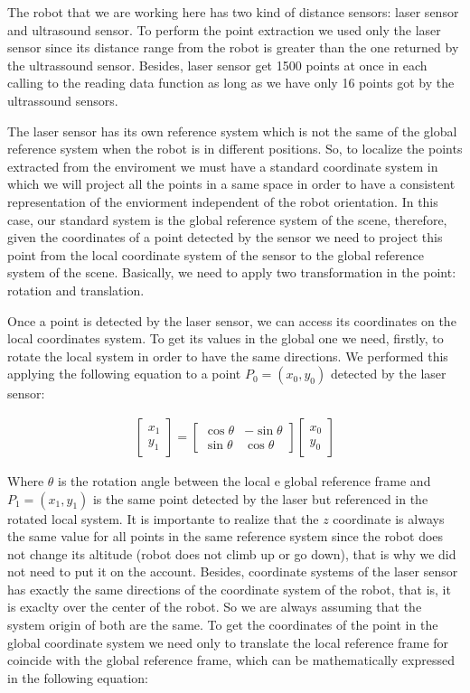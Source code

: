 \documentclass[twoside,conference,a4paper]{IEEEtran}
\begin{document}
The robot that we are working here has two kind of distance sensors: laser sensor and ultrasound sensor. To perform
the point extraction we used only the laser sensor since its distance range from the robot is greater than the one 
returned by the ultrassound sensor. Besides, laser sensor get 1500 points at once in each calling to the reading data 
function as long as we have only 16 points got by the ultrassound sensors. \par 
The laser sensor has its own reference system which is not the same of the global reference system when the robot is 
in different positions. So, to localize the points extracted from the enviroment we must have a standard
coordinate system in which we will project all the points in a same space in order to have a consistent representation
of the enviorment independent of the robot orientation. In this case, our standard system is the global reference system
of the scene, therefore, given the coordinates of a point detected by the sensor we need to project this point from the
local coordinate system of the sensor to the global reference system of the scene. Basically, we need to apply two 
transformation in the point: rotation and translation. \par
Once a point is detected by the laser sensor, we can access its coordinates on the local coordinates system. To get its 
values in the global one we need, firstly, to rotate the local system in order to have the same directions. 
We performed this applying the following equation to a point $ P_{0} = (x_{0}, y_{0}) $ detected by the 
laser sensor:

\begin{gather}
 \begin{bmatrix} x_{1} \\ y_{1} \end{bmatrix}
 =
  \begin{bmatrix}
   \cos \theta & -\sin \theta \\
   \sin \theta & \cos \theta 
   \end{bmatrix}
   \begin{bmatrix} x_{0} \\ y_{0} \end{bmatrix}
\end{gather}

Where $ \theta $ is the rotation angle between the local e global reference frame and $ P_{1} = (x_{1}, y_{1}) $ is the 
same point detected by the laser but referenced in the rotated local system. It is importante to realize that the $ z $ 
coordinate is always the same value for all points in the same reference system since the robot does not change its 
altitude (robot does not climb up or go down), that is why we did not need to put it on the account. Besides, coordinate 
systems of the laser sensor has exactly the same directions of the coordinate system of the robot, that is, it is 
exaclty over the center of the robot. So we are always assuming that the system origin of both are the same. To get the 
coordinates of the point in the global coordinate system we need only to translate the local reference frame for 
coincide with the global reference frame, which can be mathematically expressed in the following equation:
\end{document}
